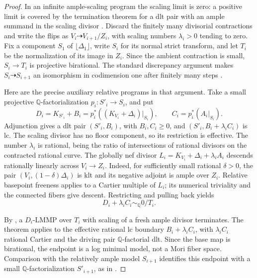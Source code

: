 \documentclass[11pt,letterpaper]{article}
\newcommand{\Q}{\mathbb{Q}}
\theoremstyle{definition}
\theoremstyle{remark}
\begin{document}
\begin{proof}
In an infinite ample-scaling program the scaling limit is zero:
a positive limit is covered by the termination theorem for a
dlt pair with an ample summand in the scaling divisor
\cite[Theorem~1.9(ii), equivalently Theorem~4.1(ii)]
{Proj-Birkar2012Special}. Discard the finitely many divisorial
contractions and write the flips as \(V_i\dashrightarrow V_{i+1}/Z_i\),
with scaling numbers \(\lambda_i>0\) tending to zero.
Fix a component \(S_1\) of \(\lfloor\Delta_1\rfloor\), write
\(S_i\) for its normal strict transform, and let \(T_i\) be the
normalization of its image in \(Z_i\). Since the ambient contraction
is small, \(S_i\to T_i\) is projective birational. The standard
discrepancy argument makes \(S_i\dashrightarrow S_{i+1}\)
an isomorphism in codimension one after finitely many steps
\cite[proof of Lemma~3.6]{Proj-Birkar2010}.

Here are the precise auxiliary relative programs in that argument.
Take a small projective \(\Q\)-factorialization
\(p_i:S'_i\to S_i\), and put
\[
 D_i=K_{S'_i}+B_i=p_i^*((K_{V_i}+\Delta_i)|_{S_i}),
 \qquad C_i=p_i^*(A_i|_{S_i}).
\]
Adjunction gives a dlt pair \((S'_i,B_i)\), with \(B_i,C_i\geq0\),
and \((S'_i,B_i+\lambda_i C_i)\) is lc. The scaling divisor
has no floor component, so its restriction is effective.
The number \(\lambda_i\) is rational, being the ratio of
intersections of rational divisors on the contracted rational curve.
The globally nef divisor
\(L_i=K_{V_i}+\Delta_i+\lambda_i A_i\) descends rationally
linearly across \(V_i\to Z_i\). Indeed, for sufficiently small
rational \(\delta>0\), the pair
\((V_i,(1-\delta)\Delta_i)\) is klt and its negative adjoint
is ample over \(Z_i\). Relative basepoint freeness applies to a
Cartier multiple of \(L_i\); its numerical triviality and the
connected fibers give descent. Restricting and pulling back yields
\[
 D_i+\lambda_i C_i\sim_{\Q}0/T_i.
\]

By \cite[Theorem~1.1(3)]{Proj-Birkar2012Special}, a \(D_i\)-LMMP
over \(T_i\) with scaling of a fresh ample divisor terminates.
The theorem applies to the effective rational lc boundary
\(B_i+\lambda_i C_i\), with \(\lambda_i C_i\) rational Cartier
and the driving pair \(\Q\)-factorial dlt. Since the base map
is birational, the endpoint is a log minimal model, not a Mori
fiber space. Comparison with the relatively ample model
\(S_{i+1}\) identifies this endpoint with a small
\(\Q\)-factorialization \(S'_{i+1}\), as in
\cite[Remarks~2.9--2.10]{Proj-Birkar2012Special}.


\end{proof}
\end{document}
